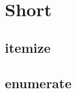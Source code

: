\documentclass{gsbbeamer}
\date{\today}
\begin{document}
\begin{frame}
	\titlepage
	\unilogo
\end{frame}


\section{\color{white} Short}
\subsection{itemize}
\begin{myframe}
\begin{myitems}
	\item \lipsum[1][1]
	\item \lipsum[1][2-4]
	\begin{myitems}
		\item \lipsum[1][1]
	\end{myitems}
	\item \lipsum[1][3]
	\item \lipsum[1][2-5]
\end{myitems}
\end{myframe}

\subsection{enumerate}
\begin{myframe}
\begin{myenums}
	\item \lipsum[1][1]
	\item \lipsum[1][2-4]
	\begin{myenums}
		\item \lipsum[1][1]
	\end{myenums}
	\item \lipsum[1][3]
	\item \lipsum[1][2-5]
\end{myenums}
\end{myframe}
\end{document}

